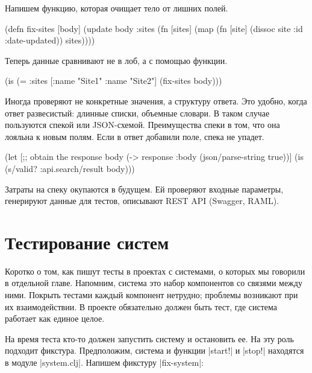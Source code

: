 Напишем функцию, которая очищает тело от лишних полей.

\begin{english}
  \begin{clojure}
(defn fix-sites [body]
  (update body :sites
          (fn [sites]
            (map (fn [site]
                   (dissoc site :id :date-updated))
                 sites))))
  \end{clojure}
\end{english}

Теперь данные сравнивают не в лоб, а с помощью функции.

\begin{english}
  \begin{clojure}
(is (= {:sites [{:name "Site1"} {:name "Site2"}]}
       (fix-sites body)))
  \end{clojure}
\end{english}

Иногда проверяют не конкретные значения, а структуру ответа. Это удобно, когда
ответ развесистый: длинные списки, объемные словари. В таком случае пользуются
спекой или JSON-схемой. Преимущества спеки в том, что она лояльна к новым
полям. Если в ответ добавили поле, спека не упадет.

\begin{english}
  \begin{clojure}
(let [;; obtain the response
      body (-> response :body (json/parse-string true))]
  (is (s/valid? :api.search/result body)))
  \end{clojure}
\end{english}

Затраты на спеку окупаются в будущем. Ей проверяют входные параметры, генерируют
данные для тестов, описывают REST API (Swagger, RAML).

\section{Тестирование систем}

Коротко о том, как пишут тесты в проектах с системами, о которых мы говорили в
отдельной главе. Напомним, система это набор компонентов со связями между
ними. Покрыть тестами каждый компонент нетрудно; проблемы возникают при их
взаимодействии. В проекте обязательно должен быть тест, где система работает как
единое целое.

На время теста кто-то должен запустить систему и остановить ее. На эту роль
подходит фикстура. Предположим, система и функции \spverb|start!| и
\spverb|stop!| находятся в модуле \spverb|system.clj|. Напишем фикстуру
\spverb|fix-system|:

